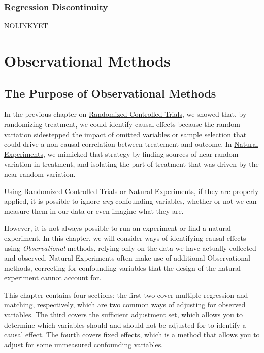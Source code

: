 \documentclass[]{book}
\theoremstyle{definition}
\theoremstyle{definition}
\theoremstyle{definition}
\theoremstyle{remark}
\begin{document}
\section{Regression Discontinuity}\label{regression-discontinuity}

\url{NOLINKYET}

\part{Observational
Methods}\label{part-observational-methods}

\chapter{The Purpose of Observational
Methods}\label{the-purpose-of-observational-methods}

In the previous chapter on \href{'03_RCT.html'}{Randomized Controlled
Trials}, we showed that, by randomizing treatment, we could identify
causal effects because the random variation sidestepped the impact of
omitted variables or sample selection that could drive a non-causal
correlation between treatement and outcome. In
\href{'04_NE.html'}{Natural Experiments}, we mimicked that strategy by
finding sources of near-random variation in treatment, and isolating the
part of treatment that was driven by the near-random variation.

Using Randomized Controlled Trials or Natural Experiments, if they are
properly applied, it is possible to ignore \emph{any} confounding
variables, whether or not we can measure them in our data or even
imagine what they are.

However, it is not always possible to run an experiment or find a
natural experiment. In this chapter, we will consider ways of
identifying causal effects using \emph{Observational} methods, relying
only on the data we have actually collected and observed. Natural
Experiments often make use of additional Observational methods,
correcting for confounding variables that the design of the natural
experiment cannot account for.

This chapter contains four sections: the first two cover multiple
regression and matching, respectively, which are two common ways of
adjusting for observed variables. The third covers the sufficient
adjustment set, which allows you to determine which variables should and
should not be adjusted for to identify a causal effect. The fourth
covers fixed effects, which is a method that allows you to adjust for
some unmeasured confounding variables.
\end{document}
